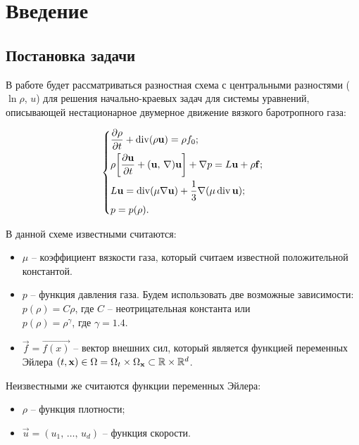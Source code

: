 \section{Введение}

\subsection{Постановка задачи}

В работе будет рассматриваться разностная схема с центральными разностями ($\ln{\rho}$, $u$) для решения начально-краевых задач для системы уравнений, описывающей нестационарное двумерное движение вязкого баротропного газа:

\begin{equation} 
\label{eq:task}
\begin{dcases}
    \deriv{\rho}{t} + \div (\rho \vec{u}) = \rho f_0; \\
    \rho \bigg[ \deriv{\vec{u}}{t} + (\vec{u}, \, \nabla) \vec{u} \bigg] + \nabla p = L \vec{u} + \rho \vec{f}; \\
    L \vec{u} = \div (\mu \nabla \vec{u}) + \frac{1}{3} \nabla (\mu \div \vec{u}); \\
    p = p (\rho).
\end{dcases}
\end{equation}

\bigskip
В данной схеме известными считаются:
\begin{itemize}
	\item $\mu$ -- коэффициент вязкости газа, который считаем известной поло­жительной константой.
	\item $p$ -- функция давления газа.
	Будем использовать две возможные зависимости: \\
	$p(\rho) = C\rho$, где $C$ -- неотрицательная константа или \\
	$p(\rho) = \rho ^{\gamma}$, где $\gamma = 1.4$.
	\item $\vec{f} = \vec{f(x)}$ -- вектор внешних сил, который является функцией переменных Эйлера 
	$(t,\vec{x}) \in \Omega = \Omega_t \times \Omega_{\vec{x}} \subset \bR \times \bR^d$.
\end{itemize}

Неизвестными же считаются функции переменных Эйлера:
\begin{itemize}
	\item $\rho$ -- функция плотности;
	\item $\vec{u} = (u_1, \, \ldots, \, u_d)$ -- функция скорости.
\end{itemize}

